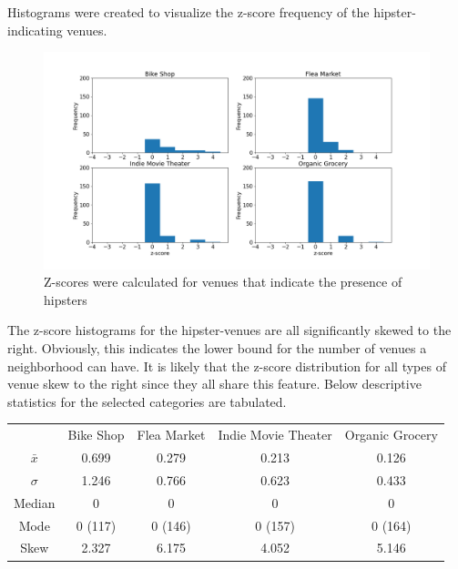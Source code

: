 \documentclass[12pt]{article}
\begin{document}
	Histograms were created to visualize the z-score frequency of the hipster-indicating venues. 	\\
\begin{figure}[H]
  \includegraphics[width=6.5in]{zscores.png}
  \caption{Z-scores were calculated for venues that indicate the presence of hipsters}
  \label{fig:zscores}
\end{figure}
	The z-score histograms for the hipster-venues are all significantly skewed to the right. 
	Obviously, this indicates the lower bound for the number of venues a neighborhood can have.
	It is likely that the z-score distribution for all types of venue skew to the right since they all share this feature.
	Below descriptive statistics for the selected categories are tabulated.\\
\begin{center}
\begin{tabular}{c c c c c}
			& Bike Shop 	& Flea Market 	& Indie Movie Theater	& Organic Grocery	\\
	$\bar{x}$	& 0.699		& 0.279		& 0.213			& 0.126		\\	
	$\sigma$	& 1.246		& 0.766		& 0.623			& 0.433		\\
	Median		& 0		& 0		& 0			& 0		\\
	Mode		& 0 (117)	& 0 (146)	& 0 (157)		& 0 (164) 	\\
	Skew		& 2.327		& 6.175		& 4.052			& 5.146 	\\
\end{tabular}
\end{center}
\end{document}
